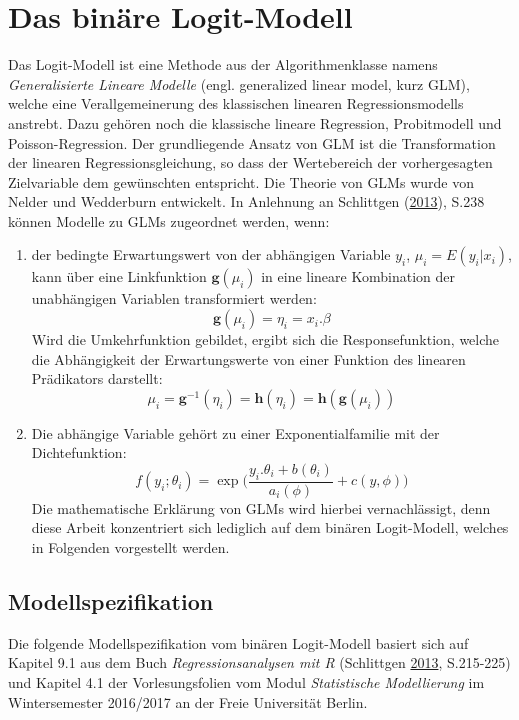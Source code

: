 \documentclass[12pt,]{article}
\providecommand{\tightlist}{%
  \setlength{\itemsep}{0pt}\setlength{\parskip}{0pt}}
\begin{document}
\newpage 

\section{Das binäre Logit-Modell}\label{das-binare-logit-modell}

Das Logit-Modell ist eine Methode aus der Algorithmenklasse namens
\emph{Generalisierte Lineare Modelle} (engl. generalized linear model,
kurz GLM), welche eine Verallgemeinerung des klassischen linearen
Regressionsmodells anstrebt. Dazu gehören noch die klassische lineare
Regression, Probitmodell und Poisson-Regression. Der grundliegende
Ansatz von GLM ist die Transformation der linearen Regressionsgleichung,
so dass der Wertebereich der vorhergesagten Zielvariable dem gewünschten
entspricht. Die Theorie von GLMs wurde von Nelder und Wedderburn
entwickelt. In Anlehnung an Schlittgen
(\protect\hyperlink{ref-schlittgen2013regressionsanalysen}{2013}), S.238
können Modelle zu GLMs zugeordnet werden, wenn:

\begin{enumerate}
\def\labelenumi{\arabic{enumi}.}
\tightlist
\item
  der bedingte Erwartungswert von der abhängigen Variable \(y_i\),
  \(\mu_i = E(y_i|x_i)\), kann über eine Linkfunktion
  \(\mathbf{g}(\mu_i)\) in eine lineare Kombination der unabhängigen
  Variablen transformiert werden:
  \[\mathbf{g}(\mu_i) = \eta_i = x_i.\beta\] Wird die Umkehrfunktion
  gebildet, ergibt sich die Responsefunktion, welche die Abhängigkeit
  der Erwartungswerte von einer Funktion des linearen Prädikators
  darstellt:
  \[\mu_i = \mathbf{g}^{-1}(\eta_i) = \mathbf{h}(\eta_i) =  \mathbf{h}(\mathbf{g}(\mu_i))\]
\item
  Die abhängige Variable gehört zu einer Exponentialfamilie mit der
  Dichtefunktion: \[
  f(y_i;\theta_i) = \exp \Bigg( \frac{y_i.\theta_i + b(\theta_i)}{a_i(\phi)} + c(y,\phi) \Bigg)
  \] Die mathematische Erklärung von GLMs wird hierbei vernachlässigt,
  denn diese Arbeit konzentriert sich lediglich auf dem binären
  Logit-Modell, welches in Folgenden vorgestellt werden.
\end{enumerate}

\subsection{Modellspezifikation}\label{modellspezifikation}

Die folgende Modellspezifikation vom binären Logit-Modell basiert sich
auf Kapitel 9.1 aus dem Buch \emph{Regressionsanalysen mit R}
(Schlittgen
\protect\hyperlink{ref-schlittgen2013regressionsanalysen}{2013},
S.215-225) und Kapitel 4.1 der Vorlesungsfolien vom Modul
\emph{Statistische Modellierung} im Wintersemester 2016/2017 an der
Freie Universität Berlin.
\end{document}
